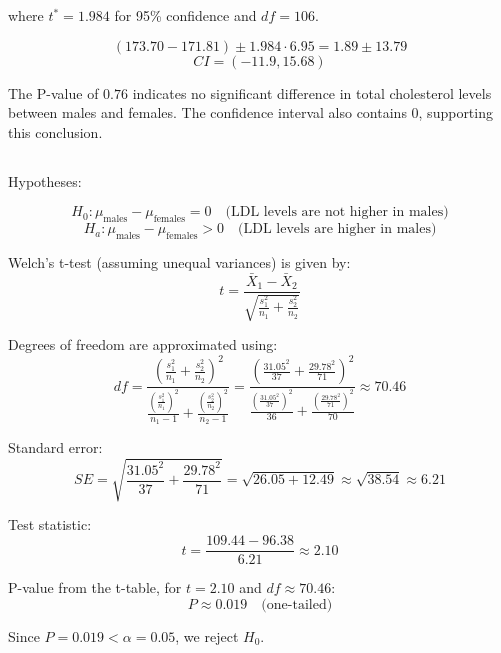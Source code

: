 \documentclass{homework}
\begin{document}
where \( t^* = 1.984 \) for 95\% confidence and \( df = 106 \).

\[
(173.70 - 171.81) \pm 1.984 \cdot 6.95 = 1.89 \pm 13.79
\]
\[
CI = (-11.9, 15.68)
\]

The P-value of \( 0.76 \) indicates no significant difference in total cholesterol levels between males and females. The confidence interval also contains 0, supporting this conclusion.

\subsection{}

Hypotheses:

\[
H_0: \mu_{\text{males}} - \mu_{\text{females}} = 0 \quad \text{(LDL levels are not higher in males)}
\]
\[
H_a: \mu_{\text{males}} - \mu_{\text{females}} > 0 \quad \text{(LDL levels are higher in males)}
\]

Welch's t-test (assuming unequal variances) is given by:
\[
t = \frac{\bar{X}_1 - \bar{X}_2}{\sqrt{\frac{s_1^2}{n_1} + \frac{s_2^2}{n_2}}}
\]

Degrees of freedom are approximated using:
\[
df = \frac{\left(\frac{s_1^2}{n_1} + \frac{s_2^2}{n_2}\right)^2}{\frac{\left(\frac{s_1^2}{n_1}\right)^2}{n_1 - 1} + \frac{\left(\frac{s_2^2}{n_2}\right)^2}{n_2 - 1}} = 
\frac{\left(\frac{31.05^2}{37} + \frac{29.78^2}{71}\right)^2}{\frac{\left(\frac{31.05^2}{37}\right)^2}{36} + \frac{\left(\frac{29.78^2}{71}\right)^2}{70}} \approx 70.46
\]

Standard error:
\[
SE = \sqrt{\frac{31.05^2}{37} + \frac{29.78^2}{71}} = \sqrt{26.05 + 12.49} \approx \sqrt{38.54} \approx 6.21
\]

Test statistic:
\[
t = \frac{109.44 - 96.38}{6.21} \approx 2.10
\]

P-value from the t-table, for \( t = 2.10 \) and \( df \approx 70.46 \):
\[
P \approx 0.019 \quad \text{(one-tailed)}
\]

Since \( P = 0.019 < \alpha = 0.05 \), we reject \( H_0 \).
\end{document}
